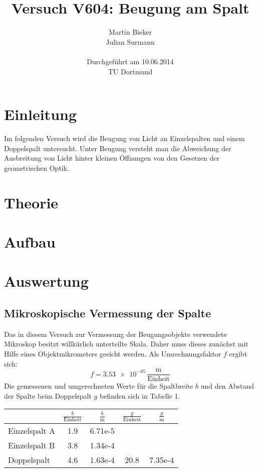 \documentclass[11pt,ngerman,a4paper]{article}
\title{\textbf{Versuch V604: Beugung am Spalt}}
\author{Martin Bieker\\
		Julian Surmann\\
		\\
		Durchgef\"{u}hrt am 10.06.2014\\
		TU Dortmund}
\date{}
\begin{document}
\renewcommand\tablename{Tabelle}
\renewcommand\figurename{Abbildung}
\maketitle
\thispagestyle{empty}
\newpage
\clearpage
\setcounter{page}{1}


\section{Einleitung}
Im folgenden Versuch wird die Beugung von Licht an Einzelspalten und einem Doppelspalt untersucht. Unter Beugung versteht man die Abweichung der Ausbreitung von Licht hinter kleinen Öffnungen von den Gesetzen der geometrischen Optik.
\section{Theorie}

\section{Aufbau}

\section{Auswertung}
\subsection{Mikroskopische Vermessung der Spalte}
Das in diesem Versuch zur Vermessung der Beugungsobjekte verwendete Mikroskop besitzt willkürlich unterteilte Skala. Daher muss dieses zunächst mit Hilfe eines Objektmikrometers geeicht werden. Als Umrechnungsfaktor $f$ ergibt sich:
\[
f = \num{3.53e-05}\,\frac{\si{\meter}}{\mathrm{Einheit}}
\]
Die gemessenen und umgerechneten Werte für die Spaltbreite $b$ und den Abstand der Spalte beim Doppelspalt $g$ befinden sich in Tabelle 1.
\begin{table}[h]
\centering
\begin{tabular}{lSSSS}

\toprule
&$\frac{b}{\mathrm{Einheit}}$ & $\frac{b}{\si{\meter}}$ & $\frac{g}{\mathrm{Einheit}}$ &$\frac{g}{\si{\meter}}$\\
\midrule
Einzelspalt A & 1.9  &6.71e-5 & &\\
Einzelspalt B & 3.8  &1.34e-4 &&\\
Doppelspalt   & 4.6  & 1.63e-4&20.8&7.35e-4\\
\bottomrule
\end{tabular}
\end{table}
\end{document}
